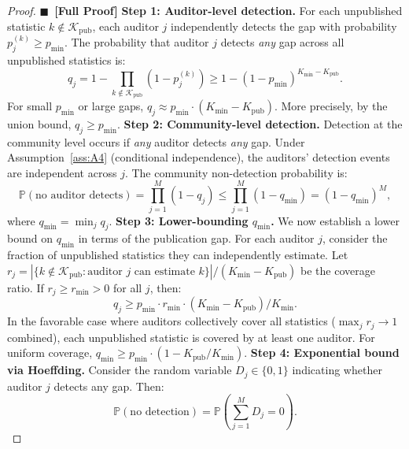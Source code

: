 \documentclass[11pt,a4paper]{article}
\theoremstyle{definition}
\newcommand{\rigorFull}[0]{$\blacksquare$~\textbf{[Full Proof]}}
\newcommand{\Pbb}{\mathbb{P}}
\begin{document}
\begin{proof}\rigorFull
\textbf{Step 1: Auditor-level detection.} For each unpublished statistic $k \notin \mathcal{K}_{\mathrm{pub}}$, each auditor $j$ independently detects the gap with probability $p_j^{(k)} \geq p_{\min}$. The probability that auditor $j$ detects \textit{any} gap across all unpublished statistics is:
\begin{equation}
    q_j = 1 - \prod_{k \notin \mathcal{K}_{\mathrm{pub}}} (1 - p_j^{(k)}) \geq 1 - (1 - p_{\min})^{K_{\min} - K_{\mathrm{pub}}}.
    \label{eq:q_j}
\end{equation}
For small $p_{\min}$ or large gaps, $q_j \approx p_{\min} \cdot (K_{\min} - K_{\mathrm{pub}})$. More precisely, by the union bound, $q_j \geq p_{\min}$.
\textbf{Step 2: Community-level detection.} Detection at the community level occurs if \textit{any} auditor detects \textit{any} gap. Under Assumption~\ref{ass:A4} (conditional independence), the auditors' detection events are independent across $j$. The community non-detection probability is:
\begin{equation}
    \Pbb(\text{no auditor detects}) = \prod_{j=1}^{M} (1 - q_j) \leq \prod_{j=1}^{M} (1 - q_{\min}) = (1 - q_{\min})^M,
    \label{eq:no_detection}
\end{equation}
where $q_{\min} = \min_j q_j$.
\textbf{Step 3: Lower-bounding $q_{\min}$.} We now establish a lower bound on $q_{\min}$ in terms of the publication gap. For each auditor $j$, consider the fraction of unpublished statistics they can independently estimate. Let $r_j = |\{k \notin \mathcal{K}_{\mathrm{pub}} : \text{auditor $j$ can estimate $k$}\}| / (K_{\min} - K_{\mathrm{pub}})$ be the coverage ratio. If $r_j \geq r_{\min} > 0$ for all $j$, then:
\begin{equation}
    q_j \geq p_{\min} \cdot r_{\min} \cdot (K_{\min} - K_{\mathrm{pub}}) / K_{\min}.
    \label{eq:q_bound}
\end{equation}
In the favorable case where auditors collectively cover all statistics ($\max_j r_j \to 1$ combined), each unpublished statistic is covered by at least one auditor. For uniform coverage, $q_{\min} \geq p_{\min} \cdot (1 - K_{\mathrm{pub}}/K_{\min})$.
\textbf{Step 4: Exponential bound via Hoeffding.} Consider the random variable $D_j \in \{0, 1\}$ indicating whether auditor $j$ detects any gap. Then:
\begin{equation}
    \Pbb(\text{no detection}) = \Pbb\left(\sum_{j=1}^{M} D_j = 0\right).
    \label{eq:sum_D}
\end{equation}

\end{proof}
\end{document}
